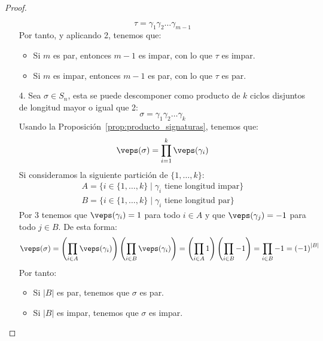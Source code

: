 \begin{prop}
\begin{proof}
\begin{enumerate}
                \begin{equation*}
                    \tau = \gamma_1\gamma_2\ldots \gamma_{m-1}
                \end{equation*}
                Por tanto, y aplicando 2, tenemos que:
                \begin{itemize}
                    \item Si $m$ es par, entonces $m-1$ es impar, con lo que $\tau$ es impar.
                    \item Si $m$ es impar, entonces $m-1$ es par, con lo que $\tau$ es par.
                \end{itemize}
            \item[4.] Sea $\sigma\in S_n$, esta se puede descomponer como producto de $k$ ciclos disjuntos de longitud mayor o igual que 2:
                \begin{equation*}
                    \sigma = \gamma_1\gamma_2 \ldots \gamma_k
                \end{equation*}
                Usando la Proposición~\ref{prop:producto_signaturas}, tenemos que:
                \begin{equation*}
                    \veps(\sigma) = \prod_{i=1}^{k}\veps(\gamma_i)
                \end{equation*}
                Si consideramos la siguiente partición de $\{1,\ldots,k\}$:
                \begin{gather*}
                    A = \{i \in \{1,\ldots,k\} \mid \gamma_i \text{\ tiene longitud impar}\} \\
                    B = \{i \in \{1,\ldots,k\} \mid \gamma_i \text{\ tiene longitud par}\} 
                \end{gather*}
                Por 3 tenemos que $\veps(\gamma_i) = 1$ para todo $i \in A$ y que $\veps(\gamma_j) = -1$ para todo $j\in B$. De esta forma:
                \begin{equation*}
                    \veps(\sigma) = \left(\prod_{i \in A}\veps(\gamma_i)\right) \left(\prod_{i \in B}\veps(\gamma_i)\right) = \left(\prod_{i \in A}1\right) \left(\prod_{i \in B}-1\right) = \prod_{i \in B}-1 = {(-1)}^{|B|}
                \end{equation*}
                Por tanto:
                \begin{itemize}
                    \item Si $|B|$ es par, tenemos que $\sigma$ es par.
                    \item Si $|B|$ es impar, tenemos que $\sigma$ es impar.
                \end{itemize}
        \end{enumerate}
    \end{proof}
\end{prop}

